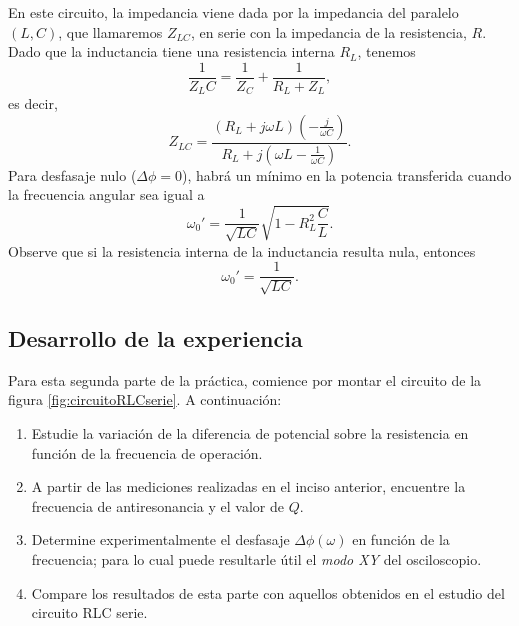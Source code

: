\documentclass[laboratorio]{guia}
\begin{document}
En este circuito, la impedancia viene dada por la impedancia del paralelo $(L,C)$, que llamaremos $Z_{LC}$, en serie con la impedancia de la resistencia, $R$.
Dado que la inductancia tiene una resistencia interna $R_L$, tenemos 
\begin{equation}
    \frac{1}{Z_LC} = \frac{1}{Z_C} + \frac{1}{R_L+Z_L},
\end{equation}
es decir,
\begin{equation}
    Z_{LC} = \frac{ \left( R_L + j \omega L \right) \left( -\frac{j}{\omega C}  \right)   }{R_L + j \left( \omega L - \frac{1}{\omega C}\right)}.
\end{equation}
Para desfasaje nulo (\( \Delta \phi = 0\)), habrá un mínimo en la potencia transferida cuando la frecuencia angular sea igual a
\begin{equation}
    \omega_0' = \frac{1}{\sqrt{LC}} \sqrt{1 - R_L^2 \frac{C}{L}}.
\end{equation}
Observe que si la resistencia interna de la inductancia resulta nula, entonces
\begin{equation}
    \omega_0' = \frac{1}{\sqrt{LC}}.
\end{equation}


\subsection{Desarrollo de la experiencia}
Para esta segunda parte de la práctica, comience por montar el circuito de la figura \ref{fig:circuitoRLCserie}.
A continuación:
\begin{enumerate}
    \item Estudie la variación de la diferencia de potencial sobre la resistencia en función de la frecuencia de operación. 
    \item A partir de las mediciones realizadas en el inciso anterior, encuentre la frecuencia de antiresonancia y el valor de \(Q\).     
    \item Determine experimentalmente el desfasaje \( \Delta \phi(\omega)\) en función de la frecuencia; para lo cual puede resultarle útil el {\it modo XY} del osciloscopio.
    \item Compare los resultados de esta parte con aquellos obtenidos en el estudio del circuito RLC serie.
\end{enumerate}


\nocite{Alonso1998,Crawford1994,Purcell1988,Reitz1996,Trelles1984,Reitz1996}
 

\end{document}
